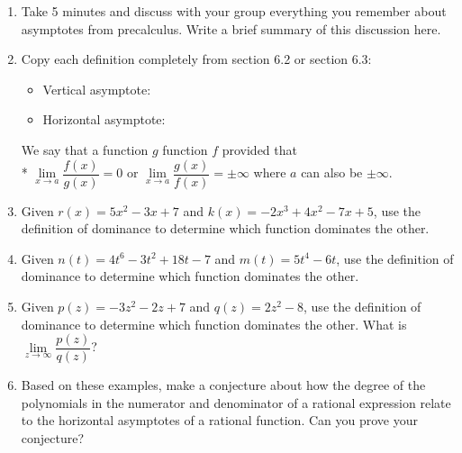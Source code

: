 \documentclass[handout,nooutcomes,noauthor]{Ximera}
\begin{document}
	\begin{enumerate}[label=\arabic*]
		\item Take 5 minutes and discuss with your group everything you remember about asymptotes from precalculus.  Write a brief summary of this discussion here.
		\item Copy each definition completely from section 6.2 or section 6.3:
 		\begin{itemize}
 			\item Vertical asymptote:
 			\vspace{2cm}
 			\item Horizontal asymptote:
 			\vspace{2.5cm}
 		\end{itemize}
		\clearpage
		
		\begin{definition}
			We say that a function $ g $  function $ f $ provided that \\*
			$ \lim\limits_{x \to a}\dfrac{f(x)}{g(x)} = 0 $ or $ \lim\limits_{x \to a} \dfrac{g(x)}{f(x)} = \pm \infty $ where $a$ can also be  $\pm \infty$.
		\end{definition}
		\vspace{5mm}
		\item Given $ r(x)=5x^2-3x+7 $ and $ k(x)=-2x^3+4x^2-7x+5 $, use the definition of dominance to determine which function dominates the other.
		\item Given $ n(t)=4t^6-3t^2+18t-7 $ and $ m(t)=5t^4-6t $, use the definition of dominance to determine which function dominates the other.
		\item Given $ p(z)=-3z^2-2z+7 $ and $ q(z) = 2z^2-8 $, use the definition of dominance to determine which function dominates the other.  What is $ \lim\limits_{z \to \infty} \dfrac{p(z)}{q(z)} $?
		\item Based on these examples, make a conjecture about how the degree of the polynomials in the numerator and denominator of a rational expression relate to the horizontal asymptotes of a rational function.  Can you prove your conjecture?
		
		\clearpage
		

\end{enumerate}
\end{document}
